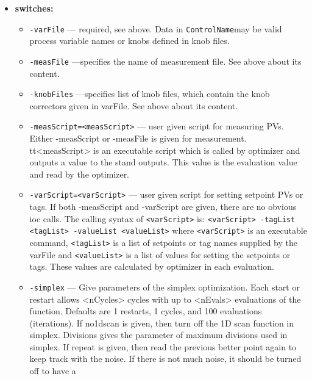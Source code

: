 \begin{itemize}
\begin{itemize}
\end{itemize}

%
\item {\bf switches:}
%
%
    \begin{itemize}
%
%
        \item {\tt -varFile} --- required, see above. Data in \verb+ControlName+may be valid process
                variable names or knobs defined in knob files.
        \item {\tt -measFile} ---specifies the name of measurement file. See above about its content.
         \item {\tt -knobFiles} ---specifies list of knob files, which contain the knob correctors
                given in varFile. See above about its content.
        \item {\tt -measScript=<measScript>} --- user given script for measuring PVs. Either -measScript or -measFile
                is given for measurement. {\\tt<measScript>} is an executable script which is called by optimizer and
                outputs a value to the stand outputs. This value is the evaluation value and read by the optimizer.
        \item {\tt -varScript=<varScript>} --- user given script for setting setpoint PVs or tags. 
                If both -measScript and -varScript are given, there are no obvious ioc calls.
                The calling syntax of {\tt<varScript>} is: {\tt<varScript> -tagList <tagList> -valueList <valueList>}
                where {\tt<varScript>} is an executable command, {\tt<tagList>} is a list of setpoints or 
                tag names supplied by the varFile and {\tt<valueList>} is a list of values for 
                setting the setpoints or tags. These values are calculated by optimizer in each evaluation.
        \item {\tt -simplex} ---  Give parameters of the simplex optimization. Each start or restart 
                allows <nCycles> cycles with up to <nEvals> evaluations of the function.  Defaults are
                1 restarts, 1 cycles, and 100 evaluations (iterations). If no1dscan is given, then turn
                off the 1D scan function in simplex. Divisions gives the parameter of maximum divisions
                used in simplex. If repeat is given, then read the previous better point again to keep
                track with the noise. If there is not much noise, it should be turned off to have a 

\end{itemize}
\end{itemize}
